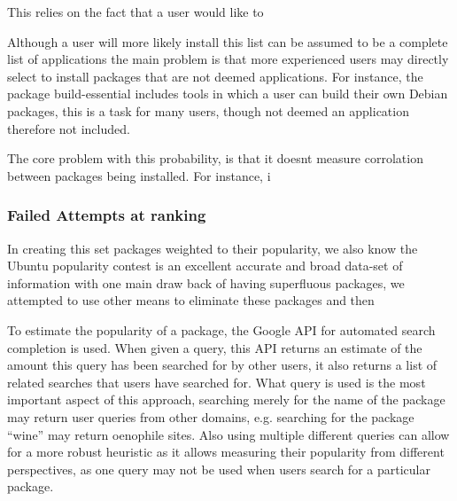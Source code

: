 This relies on the fact that a user would like to 

Although a user will more likely install this list can be assumed to be a complete list of applications 
the main problem is that more experienced users may directly select to install packages that are not deemed applications.
For instance, the package build-essential includes tools in which a user can build their own Debian packages,
this is a task for many users, though not deemed an application therefore not included.

The core problem with this probability, is that it doesnt measure corrolation between packages being installed.
For instance, i


\subsubsection{Failed Attempts at ranking}
In creating this set packages weighted to their popularity, we also  know the Ubuntu popularity contest is an excellent accurate and broad data-set of information with one main draw back of having superfluous packages,
we attempted to use other means to eliminate these packages and then  

To estimate the popularity of a package, the Google API for automated search completion is used.
When given a query, this API returns an estimate of the amount this query has been searched for by other users,
it also returns a list of related searches that users have searched for.
What query is used is the most important aspect of this approach,
searching merely for the name of the package may return user queries from other domains, e.g. searching for the package ``wine'' may return oenophile sites.
Also using multiple different queries can allow for a more robust heuristic as it allows measuring their popularity from different perspectives,
as one query may not be used when users search for a particular package.

